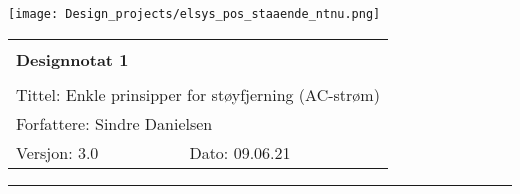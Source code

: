 \documentclass[a4paper,11pt,norsk]{article}
\begin{document}
\begin{minipage}[c]{0.15\textwidth}
\texttt{[image: Design\_projects/elsys\_pos\_staaende\_ntnu.png]}
\end{minipage}
\begin{minipage}[c]{0.85\textwidth}

\renewcommand{\arraystretch}{1.7}
\large 
\begin{tabularx}{\textwidth}{|X|X|}
\hline
\multicolumn{2}{|l|}{} \\
\multicolumn{2}{|l|}{\huge \textbf{Designnotat 1}} \\
\multicolumn{2}{|l|}{}  \\
\hline
\multicolumn{2}{|l|}{Tittel: 
Enkle prinsipper for støyfjerning (AC-strøm)
} \\
\hline
\multicolumn{2}{|l|}{Forfattere: 
Sindre Danielsen
} \\
\hline
Versjon: 3.0 & Dato: 09.06.21
\\
\hline 
\end{tabularx}
\end{minipage}
\normalsize


\setlength{\parskip}{0ex}
\renewcommand{\baselinestretch}{0.1}\normalsize
\tableofcontents
\renewcommand{\baselinestretch}{1.00}\normalsize
\setlength{\parskip}{2ex}
\rule{\textwidth}{1pt}

\newpage
\end{document}
